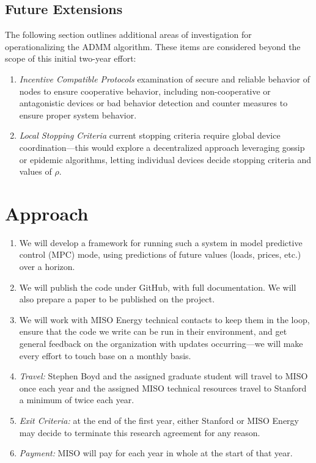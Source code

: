 \documentclass[12pt]{article}
\begin{document}
\subsection{Future Extensions}

The following section outlines additional areas of investigation
for operationalizing the ADMM algorithm.
These items are considered beyond the scope of this initial two-year effort:

\begin{enumerate}
\item \emph{Incentive Compatible Protocols}
examination of secure and reliable behavior of nodes to
ensure cooperative behavior,
including non-cooperative or antagonistic devices or bad behavior
detection and counter measures to ensure proper system behavior.

\item \emph{Local Stopping Criteria}
current stopping criteria require global device coordination---this
would explore a decentralized approach leveraging gossip or epidemic algorithms, letting
individual devices decide stopping criteria and values of $\rho$.
\end{enumerate}

\section{Approach}

\begin{enumerate}
\item 
We will develop a framework for running such a system in model predictive control (MPC)
mode, using predictions of future values (loads, prices, etc.) over a horizon.

\item
We will publish the code under GitHub,
with full documentation. We will also prepare a paper to be published on the project.

\item 
We will work with MISO Energy technical contacts to keep them in the loop,
ensure that the code we write can be run in their environment,
and get general feedback on the organization with updates
occurring---we will make every effort to touch base on a monthly basis.

\item \emph{Travel:} Stephen Boyd and the assigned graduate student
will travel to MISO once each year and the assigned MISO technical resources travel
to Stanford a minimum of twice each year.

\item \emph{Exit Criteria:} at the end of the first year,
either Stanford or MISO Energy may decide to
terminate this research agreement for any reason.

\item \emph{Payment:} MISO will pay for each year in whole at the start of that year.
\end{enumerate}


\end{document}
